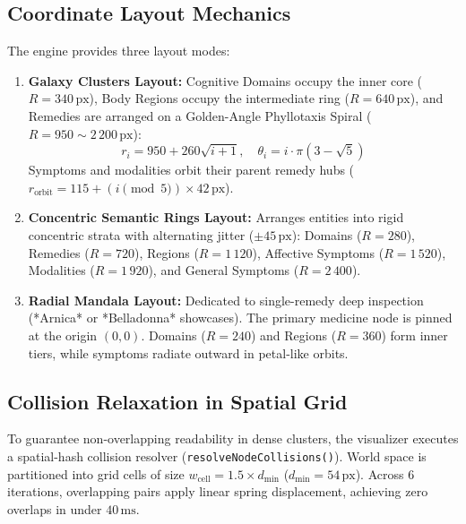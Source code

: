 \documentclass[10pt,twocolumn,letterpaper]{article}
\begin{document}
\subsection{Coordinate Layout Mechanics}
The engine provides three layout modes:
\begin{enumerate}
  \item \textbf{Galaxy Clusters Layout:}
  Cognitive Domains occupy the inner core ($R = 340\,\text{px}$), Body Regions occupy the intermediate ring ($R = 640\,\text{px}$), and Remedies are arranged on a Golden-Angle Phyllotaxis Spiral ($R = 950 \sim 2\,200\,\text{px}$):
  \begin{equation}
    r_i = 950 + 260\sqrt{i + 1}, \quad \theta_i = i \cdot \pi(3 - \sqrt{5})
  \end{equation}
  Symptoms and modalities orbit their parent remedy hubs ($r_{\text{orbit}} = 115 + (i \pmod{5}) \times 42\,\text{px}$).
  \item \textbf{Concentric Semantic Rings Layout:}
  Arranges entities into rigid concentric strata with alternating jitter ($\pm 45\,\text{px}$): Domains ($R=280$), Remedies ($R=720$), Regions ($R=1\,120$), Affective Symptoms ($R=1\,520$), Modalities ($R=1\,920$), and General Symptoms ($R=2\,400$).
  \item \textbf{Radial Mandala Layout:}
  Dedicated to single-remedy deep inspection (*Arnica* or *Belladonna* showcases). The primary medicine node is pinned at the origin $(0, 0)$. Domains ($R=240$) and Regions ($R=360$) form inner tiers, while symptoms radiate outward in petal-like orbits.
\end{enumerate}

\subsection{Collision Relaxation in Spatial Grid}
To guarantee non-overlapping readability in dense clusters, the visualizer executes a spatial-hash collision resolver (\texttt{resolveNodeCollisions()}). World space is partitioned into grid cells of size $w_{\text{cell}} = 1.5 \times d_{\min}$ ($d_{\min} = 54\,\text{px}$). Across 6 iterations, overlapping pairs apply linear spring displacement, achieving zero overlaps in under $40\,\text{ms}$.
\end{document}
